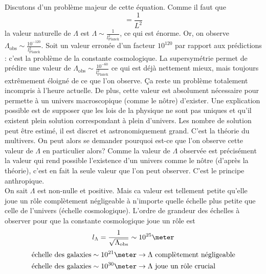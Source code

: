 \documentclass[a4paper,11pt]{report}
\begin{document}
            Discutons d'un problème majeur de cette équation. Comme il faut que
            \begin{equation}
                [\Lambda]=\frac{1}{L^2}
            \end{equation}
            la valeur naturelle de $\Lambda$ est $\Lambda\sim \frac{1}{l_{\text{Planck}}^2}$, ce qui est énorme. Or, on observe $\Lambda_{\text{obs}}\sim\frac{10^{-120}}{l_{\text{Planck}}^2}$. Soit un valeur erronée d'un facteur $10^{120}$ par rapport aux prédictions : c'est la problème de la constante cosmologique. La supersymétrie permet de prédire une valeur de $\Lambda_{\text{obs}}\sim\frac{10^{-60}}{l_{\text{Planck}}^2}$ ce qui est déjà nettement mieux, mais toujours extrêmement éloigné de ce que l'on observe. Ça reste un problème totalement incompris à l'heure actuelle. De plus, cette valeur est absolument nécessaire pour permette à un univers macroscopique (comme le nôtre) d'exister. Une explication possible est de supposer que les lois de la physique ne sont pas uniques et qu'il existent plein solution correspondant à plein d'univers. Les nombre de solution peut être estimé, il est discret et astronomiquement grand. C'est la théorie du multivers. On peut alors se demander pourquoi est-ce que l'on observe cette valeur de $\Lambda$ en particulier alors? Comme la valeur de $\Lambda$ observée est précisément la valeur qui rend possible l'existence d'un univers comme le nôtre (d'après la théorie), c'est en fait la seule valeur que l'on peut observer. C'est le principe anthropique.\\
            
            On sait $\Lambda$ est non-nulle et positive. Mais ca valeur est tellement petite qu'elle joue un rôle complètement négligeable à n'importe quelle échelle plus petite que celle de l'univers (échelle cosmologique). L'ordre de grandeur des échelles à observer pour que la constante cosmologique joue un rôle est 
            \begin{equation}
                l_\Lambda = \frac{1}{\sqrt{\Lambda_{\text{obs}}}}\sim 10^{25}\meter
            \end{equation}
            \begin{align}
                \text{échelle des galaxies} \sim 10^{21}\meter &\to \text{$\Lambda$ complètement négligeable}\\
                \text{échelle des galaxies} \sim 10^{30}\meter &\to \text{$\Lambda$ joue un rôle crucial}
            \end{align}
            
\end{document}

